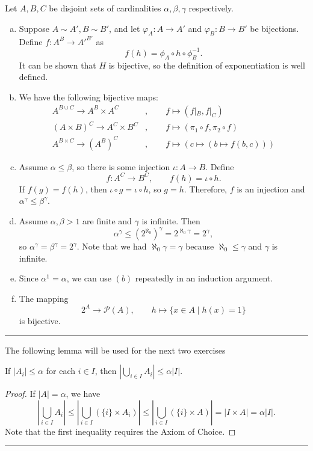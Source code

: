 \begin{solution} Let $A,B,C$ be disjoint sets of cardinalities $\alpha,\beta,\gamma$ respectively.
    \begin{enumerate}[(a)]
        \item Suppose $A\sim A',B\sim B'$, and let $\varphi_A:A\to A'$ and $\varphi_B:B\to B'$ be bijections. Define $f:A^B\to A'^{B'}$ as
        $$f(h) = \phi_A\circ h\circ\phi_B^{-1}.$$
        It can be shown that $H$ is bijective, so the definition of exponentiation is well defined.
        \item We have the following bijective maps:
        \begin{align*}
            A^{B\cup C}\to A^B\times A^C &,\qquad f\mapsto (f|_B,f|_C) \\
            (A\times B)^C\to A^C\times B^C &,\qquad f\mapsto (\pi_1\circ f, \pi_2\circ f) \\
            A^{B\times C}\to (A^B)^C &,\qquad f\mapsto (c\mapsto(b\mapsto f(b,c)))
        \end{align*}
        \item Assume $\alpha\le\beta$, so there is some injection $\iota:A\to B$. Define
        $$f:A^C\to B^C,\qquad f(h) = \iota\circ h.$$
        If $f(g) = f(h)$, then $\iota\circ g = \iota\circ h$, so $g = h$. Therefore, $f$ is an injection and $\alpha^\gamma \le \beta^\gamma$.
        \item Assume $\alpha,\beta > 1$ are finite and $\gamma$ is infinite. Then $$\alpha^\gamma \le (2^{\aleph_0})^\gamma = 2^{\aleph_0\gamma} = 2^{\gamma},$$
        so $\alpha^\gamma = \beta^\gamma = 2^\gamma$.
        Note that we had $\aleph_0\gamma = \gamma$ because $\aleph_0\le\gamma$ and $\gamma$ is infinite.
        \item Since $\alpha^1 = \alpha$, we can use $(b)$ repeatedly in an induction argument.
        \item The mapping
        $$2^A\to \mathcal{P}(A),\qquad h\mapsto \{x\in A\mid h(x) = 1\}$$
        is bijective.
    \end{enumerate}
\end{solution}
\hrule

\vspace{1em}
The following lemma will be used for the next two exercises
\begin{lemma}\label{lem:card-union}
    If $|A_i| \le \alpha$ for each $i\in I$, then $\left|\bigcup_{i\in I}A_i\right|\le \alpha|I|$.
\end{lemma}
\begin{proof}
    If $|A| = \alpha$, we have $$\left|\bigcup_{i\in I}A_i\right| \le \left|\bigcup_{i\in I}(\{i\}\times A_i)\right| \le \left|\bigcup_{i\in I}(\{i\}\times A)\right| = |I\times A| = \alpha|I|.$$
    Note that the first inequality requires the Axiom of Choice.
\end{proof}
\hrule

